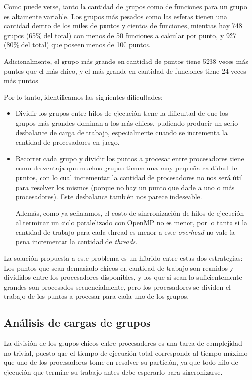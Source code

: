 Como puede verse, tanto la cantidad de grupos como de funciones para un grupo es altamente
variable. Los grupos m\'as pesados como las esferas tienen una cantidad dentro de los
miles de puntos y cientos de funciones, mientras hay 748 grupos (65\%
del total) con menos de 50 funciones a calcular por punto, y 927 (80\% del total)
que poseen menos de 100 puntos.

Adicionalmente, el grupo m\'as grande en cantidad de puntos tiene 5238 veces m\'as
puntos que el m\'as chico, y el m\'as grande en cantidad de funciones tiene 24
veces m\'as puntos

Por lo tanto, identificamos las siguientes dificultades:

\begin{itemize}
    \item Dividir los grupos entre hilos de ejecuci\'on tiene la dificultad de que
    los grupos m\'as grandes dominan a los m\'as chicos, pudiendo producir un serio
    desbalance de carga de trabajo, especialmente cuando se incrementa la cantidad de
    procesadores en juego.

    \item Recorrer cada grupo y dividir los puntos a procesar entre procesadores
    tiene como desventaja que muchos grupos tienen una muy peque\~na cantidad de
    puntos, con lo cual incrementar la cantidad de procesadores no nos ser\'a \'util
    para resolver los mismos (porque no hay un punto que darle a uno o m\'as procesadores).
    Este desbalance tambi\'en nos parece indeseable.

    Adem\'as, como ya se\~nalamos, el costo de sincronizaci\'on de hilos de
    ejecuci\'on al terminar un ciclo paralelizado con OpenMP no es menor, por
    lo tanto si la cantidad de trabajo para cada thread es menor a este
    \textit{overhead} no vale la pena incrementar la cantidad de \textit{threads}.
\end{itemize}

La soluci\'on propuesta a este problema es un h\'ibrido entre estas dos
estrategias: Los puntos que sean demasiado chicos en cantidad de trabajo son
reunidos y divididos entre los procesadores disponibles, y los que si sean lo
suficientemente grandes son procesados secuencialmente, pero los procesadores se
dividen el trabajo de los puntos a procesar para cada uno de los grupos.

\subsection{An\'alisis de cargas de grupos}
\label{PredictorCPU}
La divisi\'on de los grupos chicos entre procesadores es una tarea de complejidad
no trivial, puesto que el tiempo de ejecuci\'on total corresponde al tiempo m\'aximo
que uno de los procesadores tome en resolver su partici\'on, ya que todo hilo de
ejecuci\'on que termine su trabajo antes debe esperarlo para sincronizarse.


